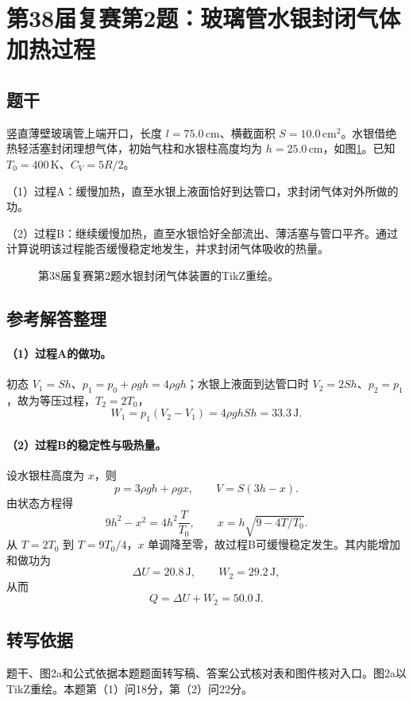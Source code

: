 \section{第38届复赛第2题：玻璃管水银封闭气体加热过程}
\subsection{题干}
竖直薄壁玻璃管上端开口，长度 $l=75.0\,\mathrm{cm}$、横截面积 $S=10.0\,\mathrm{cm^2}$。水银借绝热轻活塞封闭理想气体，初始气柱和水银柱高度均为 $h=25.0\,\mathrm{cm}$，如图\ref{fig:cpho38q02}。已知 $T_0=400\,\mathrm K$、$C_V=5R/2$。

（1）过程A：缓慢加热，直至水银上液面恰好到达管口，求封闭气体对外所做的功。

（2）过程B：继续缓慢加热，直至水银恰好全部流出、薄活塞与管口平齐。通过计算说明该过程能否缓慢稳定地发生，并求封闭气体吸收的热量。
\begin{figure}[htbp]\centering\caption{第38届复赛第2题水银封闭气体装置的TikZ重绘。}\label{fig:cpho38q02}\end{figure}
\subsection{参考解答整理}
\paragraph{（1）过程A的做功。} 初态 $V_1=Sh$、$p_1=p_0+\rho gh=4\rho gh$；水银上液面到达管口时 $V_2=2Sh$、$p_2=p_1$，故为等压过程，$T_2=2T_0$，
\[
\boxed{W_1=p_1(V_2-V_1)=4\rho ghSh=33.3\,\mathrm J.}
\]
\paragraph{（2）过程B的稳定性与吸热量。} 设水银柱高度为 $x$，则
\[
p=3\rho gh+\rho gx,\qquad V=S(3h-x).
\]
由状态方程得
\[
9h^2-x^2=4h^2\frac{T}{T_0},\qquad x=h\sqrt{9-4T/T_0}.
\]
从 $T=2T_0$ 到 $T=9T_0/4$，$x$ 单调降至零，故过程B可缓慢稳定发生。其内能增加和做功为
\[
\Delta U=20.8\,\mathrm J,\qquad W_2=29.2\,\mathrm J,
\]
从而
\[
\boxed{Q=\Delta U+W_2=50.0\,\mathrm J.}
\]
\subsection{转写依据}
题干、图2a和公式依据本题题面转写稿、答案公式核对表和图件核对入口。图2a以TikZ重绘。本题第（1）问18分，第（2）问22分。
